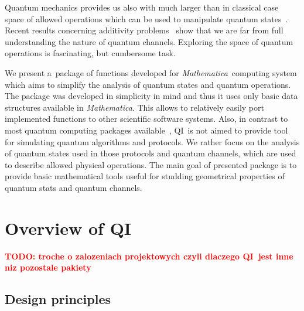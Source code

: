\documentclass[a4paper,11pt]{elsart}
\newcommand{\Mathematica}{\emph{Mathematica}}
\newcommand{\1}{{\rm 1\hspace{-0.9mm}l}}
\newcommand{\qi}{QI}
\newcommand{\todo}[1]{\textcolor{red}{\bf TODO: #1}}
\begin{document}
Quantum mechanics provides us also with much larger than in classical case space
of allowed operations which can be used to manipulate quantum
states~\cite{hayashi,BZ06}. Recent results concerning additivity
problems~\cite{hastings09superadditivity} show that we are far from full
understanding the nature of quantum channels. Exploring the space of quantum
operations is fascinating, but cumbersome task.

We present a~package of functions developed for \Mathematica\ computing system
which aims to simplify the analysis of quantum states and quantum operations.
The package was developed in simplicity in mind and thus it uses only basic data
structures available in \Mathematica. This allows to relatively easily port
implemented functions to other scientific software systems. Also, in contrast to
most quantum computing packages
available~\cite{qdensity,qucalc,quantum2,qcwave}, \qi\ is not aimed to provide
tool for simulating quantum algorithms and protocols. We rather focus on the
analysis of quantum states used in those protocols and quantum channels, which
are used to describe allowed physical operations. The main goal of presented
package is to provide basic mathematical tools useful for studding geometrical
properties of quantum stats and quantum channels.


\section{Overview of \qi}\label{sec:over}
\todo{troche o zalozeniach projektowych czyli dlaczego \qi\ jest inne niz
pozostale pakiety}

\subsection{Design principles}
\end{document}
